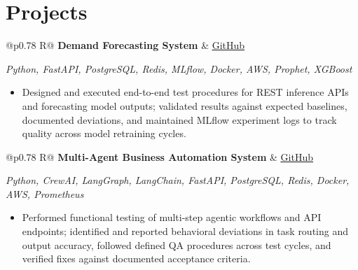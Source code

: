 \documentclass[a4paper,10pt]{article}
\newcommand{\ulink}[2]{\href{#1}{\uline{#2}}}
\newcommand{\subheading}[1]{{\color[HTML]{0A0A0A}\fontsize{12}{14}\selectfont\bfseries #1}}
\newcommand{\techstack}[1]{{\color[HTML]{5C5C5C}\fontsize{10.5}{12.5}\selectfont\itshape #1}}
\newcommand{\meta}[1]{{\color[HTML]{5C5C5C}\fontsize{10.5}{12.5}\selectfont #1}}
\begin{document}
\vspace{2pt}

\section{Projects}
\vspace{2pt}

\begin{tabularx}{\linewidth}{@{}p{0.78\linewidth} R@{}}
\subheading{Demand Forecasting System} & \meta{\ulink{https://github.com/su-jin1425/Demand-Forecasting-System}{GitHub}}
\end{tabularx}
\vspace{1pt}
\techstack{Python, FastAPI, PostgreSQL, Redis, MLflow, Docker, AWS, Prophet, XGBoost}
\begin{itemize}[nosep, leftmargin=1.5em, itemsep=1pt, topsep=2pt]
\item {\color[HTML]{0A0A0A}\fontsize{11}{14}\selectfont
Designed and executed end-to-end test procedures for REST inference APIs and forecasting model outputs; validated results against expected baselines, documented deviations, and maintained MLflow experiment logs to track quality across model retraining cycles.}
\end{itemize}

\vspace{2pt}

\begin{tabularx}{\linewidth}{@{}p{0.78\linewidth} R@{}}
\subheading{Multi-Agent Business Automation System} & \meta{\ulink{https://github.com/su-jin1425/Multi-Agent-Business-Automation}{GitHub}}
\end{tabularx}
\vspace{1pt}
\techstack{Python, CrewAI, LangGraph, LangChain, FastAPI, PostgreSQL, Redis, Docker, AWS, Prometheus}
\begin{itemize}[nosep, leftmargin=1.5em, itemsep=1pt, topsep=2pt]
\item {\color[HTML]{0A0A0A}\fontsize{11}{14}\selectfont
Performed functional testing of multi-step agentic workflows and API endpoints; identified and reported behavioral deviations in task routing and output accuracy, followed defined QA procedures across test cycles, and verified fixes against documented acceptance criteria.}
\end{itemize}

\vspace{2pt}
\end{document}
